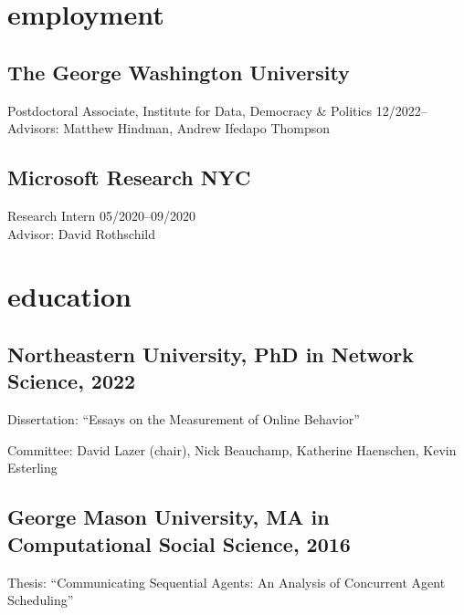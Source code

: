 \documentclass[11pt, letter]{article}
\title{}
\begin{document}
\maketitle

\section{employment}

\subsection{The George Washington University}

Postdoctoral Associate, Institute for Data, Democracy \& Politics \hfill 12/2022-- \\
Advisors: Matthew Hindman, Andrew Ifedapo Thompson
\vspace{2mm}

\subsection{Microsoft Research NYC} 
Research Intern \hfill 05/2020--09/2020 \\
Advisor: David Rothschild
\vspace{2mm}

\vspace{-1mm}

\section{education}
\subsection{Northeastern University, PhD in Network Science, 2022}
Dissertation: ``Essays on the Measurement of Online Behavior''

Committee: David Lazer (chair), Nick Beauchamp, Katherine Haenschen, Kevin Esterling

\subsection{George Mason University, MA in Computational Social Science, 2016}
Thesis: ``Communicating Sequential Agents: An Analysis of Concurrent Agent Scheduling''
\end{document}
